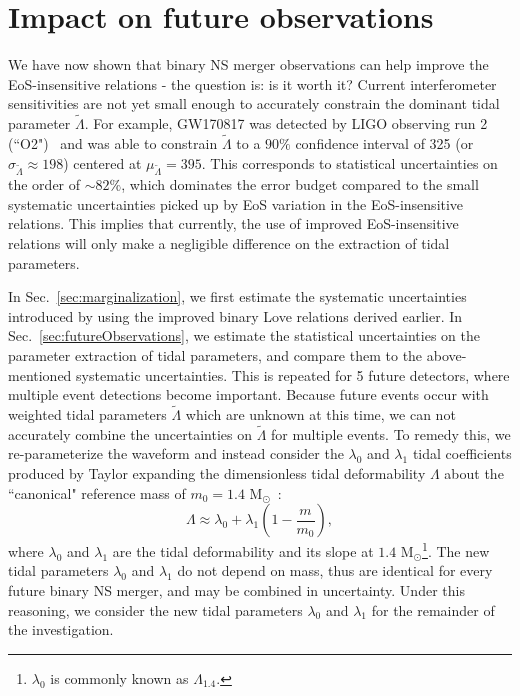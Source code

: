 \documentclass[prd,twocolumn,nofootinbib,superscriptaddress,amsmath,amssymb]{revtex4-1}
\begin{document}

\section{Impact on future observations}
\label{sec:observations}

We have now shown that binary NS merger observations can help improve the EoS-insensitive relations - the question is: is it worth it?
Current interferometer sensitivities are not yet small enough to accurately constrain the dominant tidal parameter $\tilde{\Lambda}$.
For example, GW170817 was detected by LIGO observing run 2 (``O2")~\cite{aLIGO} and was able to constrain $\tilde{\Lambda}$ to a $90\%$ confidence interval of 325 (or $\sigma_{\tilde{\Lambda}} \approx 198$) centered at $\mu_{\tilde{\Lambda}}=395$.
This corresponds to statistical uncertainties on the order of $\sim 82\%$, which dominates the error budget compared to the small systematic uncertainties picked up by EoS variation in the EoS-insensitive relations.
This implies that currently, the use of improved EoS-insensitive relations will only make a negligible difference on the extraction of tidal parameters.

In Sec.~\ref{sec:marginalization}, we first estimate the systematic uncertainties introduced by using the improved binary Love relations derived earlier.
In Sec.~\ref{sec:futureObservations}, we estimate the statistical uncertainties on the parameter extraction of tidal parameters, and compare them to the above-mentioned systematic uncertainties.
This is repeated for 5 future detectors, where multiple event detections become important.
Because future events occur with weighted tidal parameters $\tilde\Lambda$ which are unknown at this time, we can not accurately combine the uncertainties on $\tilde\Lambda$ for multiple events.
To remedy this, we re-parameterize the waveform and instead consider the $\lambda_0$ and $\lambda_1$ tidal coefficients produced by Taylor expanding the dimensionless tidal deformability $\Lambda$ about the ``canonical" reference mass of $m_0=1.4\text{ M}_{\odot}$~\cite{delPozzo:TaylorTidal,Yagi:binLove}:
\begin{equation}
\Lambda \approx \lambda_0 + \lambda_1 (1-\frac{m}{m_0}),
\end{equation}
where $\lambda_0$ and $\lambda_1$ are the tidal deformability and its slope at $1.4 \text{ M}_{\odot}$\footnote{$\lambda_0$ is commonly known as $\Lambda_{1.4}$.}. 
The new tidal parameters $\lambda_0$ and $\lambda_1$ do not depend on mass, thus are identical for every future binary NS merger, and may be combined in uncertainty.
Under this reasoning, we consider the new tidal parameters $\lambda_0$ and $\lambda_1$ for the remainder of the investigation.
\end{document}
